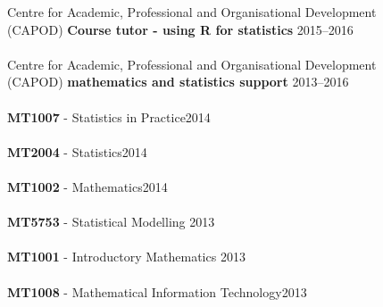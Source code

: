 \documentclass[10pt,letter]{article}
\begin{document}
 Centre for Academic, Professional and Organisational Development\\ (CAPOD) \textbf{Course tutor - using R for statistics} \hfill{2015--2016}\\
 \hdashrule[0.5ex]{4cm}{1pt}{1pt}\\
  Centre for Academic, Professional and Organisational Development\\ (CAPOD) \textbf{mathematics and statistics support} \hfill{2013--2016}\\
 \hdashrule[0.5ex]{4cm}{1pt}{1pt}\\
\textbf{MT1007} -  Statistics in Practice\hfill{2014}\\
 \hdashrule[0.5ex]{4cm}{1pt}{1pt}\\
  \textbf{MT2004} -  Statistics\hfill{2014}\\
 \hdashrule[0.5ex]{4cm}{1pt}{1pt}\\
  \textbf{MT1002} -  Mathematics\hfill{2014}\\
 \hdashrule[0.5ex]{4cm}{1pt}{1pt}\\
 \textbf{MT5753} -  Statistical Modelling \hfill{2013}\\
 \hdashrule[0.5ex]{4cm}{1pt}{1pt}\\
\textbf{MT1001} -  Introductory Mathematics \hfill{2013}\\
 \hdashrule[0.5ex]{4cm}{1pt}{1pt}\\
 \textbf{MT1008} -  Mathematical Information Technology\hfill{2013}\\

 \newpage
\end{document}
